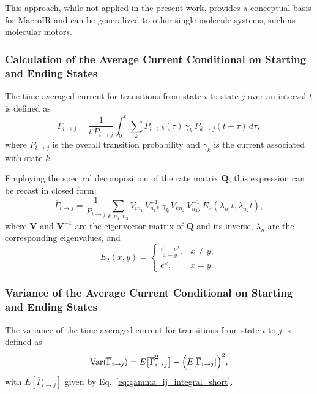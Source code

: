 \documentclass[9pt]{elife}
\begin{document}
	This approach, while not applied in the present work, provides a conceptual basis for MacroIR and can be generalized to other single-molecule systems, such as molecular motors.
	
	
	\subsubsection{Calculation of the Average Current Conditional on Starting and Ending States}
	
	The time-averaged current for transitions from state \(i\) to state \(j\) over an interval \(t\) is defined as
	\begin{equation}
		\overline{\Gamma}_{i \rightarrow j} = \frac{1}{t\,P_{i\rightarrow j}} \int_0^t \sum_k P_{i\rightarrow k}(\tau)\,\gamma_k\,P_{k\rightarrow j}(t-\tau)\,d\tau,
		\label{eq:gamma_ij_integral_short}
	\end{equation}
	where \(P_{i\rightarrow j}\) is the overall transition probability and \(\gamma_k\) is the current associated with state \(k\).
	
	Employing the spectral decomposition of the rate matrix \(\mathbf{Q}\), this expression can be recast in closed form:
	\begin{equation}
		\overline{\Gamma}_{i \rightarrow j} = \frac{1}{P_{i\rightarrow j}} \sum_{k, n_1, n_2} V_{i n_1}\,V^{-1}_{n_1 k}\,\gamma_k\,V_{k n_2}\,V^{-1}_{n_2 j}\,E_2(\lambda_{n_1}t,\lambda_{n_2}t),
		\label{eq:gamma_ij_formula_short}
	\end{equation}
	where \(\mathbf{V}\) and \(\mathbf{V}^{-1}\) are the eigenvector matrix of \(\mathbf{Q}\) and its inverse, \(\lambda_{n}\) are the corresponding eigenvalues, and
	\begin{equation}
		E_2(x,y)=
		\begin{cases}
			\frac{e^x-e^y}{x-y}, & x\neq y, \\
			e^x, & x=y.
		\end{cases}
		\label{eq:E2_short}
	\end{equation}
	
	
	\subsubsection{Variance of the Average Current Conditional on Starting and Ending States}
	
	The variance of the time-averaged current for transitions from state \(i\) to \(j\) is defined as
	\begin{equation}
		\mathrm{Var}(\overline{\Gamma}_{i\rightarrow j}) = E\bigl[\overline{\Gamma}_{i\rightarrow j}^2\bigr] - \Bigl(E[\overline{\Gamma}_{i\rightarrow j}]\Bigr)^2,
		\label{eq:variance_gamma_short}
	\end{equation}
	with \(E[\overline{\Gamma}_{i\rightarrow j}]\) given by Eq.~\ref{eq:gamma_ij_integral_short}.
	
\end{document}
